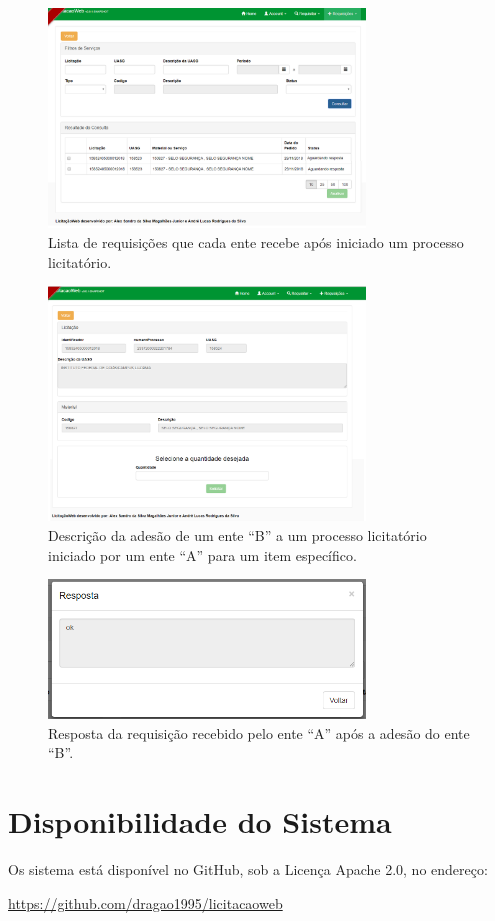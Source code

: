 \begin{figure}[htp]
	\centering
	\includegraphics[width=0.75\textwidth]{figuras/prototipo006.png}
	\caption[Lista de Requisições]{Lista de requisições que cada ente recebe após iniciado um processo licitatório.}
	\label{tela02}
\end{figure}

\begin{figure}[htp]
	\centering
	\includegraphics[width=0.75\textwidth]{figuras/prototipo003.png}
	\caption[Descrição do item selecionado]{Descrição da adesão de um ente ``B'' a um processo licitatório iniciado por um ente ``A'' para um item específico.}
	\label{tela03}
\end{figure}

\begin{figure}[htp]
	\centering
	\includegraphics[width=0.75\textwidth]{figuras/prototipo010.png}
	\caption[Resposta da Requisição]{Resposta da requisição recebido pelo ente ``A'' após a adesão do ente ``B''.}
	\label{tela04}
\end{figure}


\section{Disponibilidade do Sistema}

Os sistema está disponível no GitHub, sob a Licença Apache 2.0, no endereço:
\begin{center}
	\url{https://github.com/dragao1995/licitacaoweb}
\end{center}




